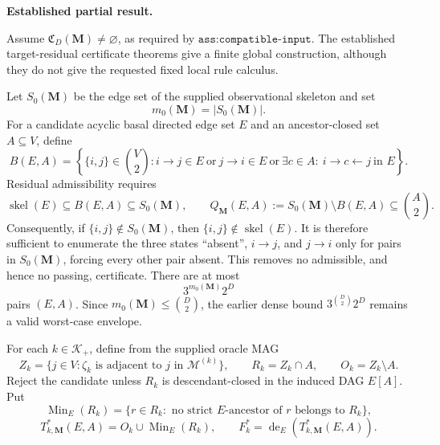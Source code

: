 \textbf{Established partial result.}

Assume \(\mathfrak C_D(\mathbf M)\ne\varnothing\), as required by \(\texttt{ass:compatible-input}\).  The established target-residual certificate theorems give a finite global construction, although they do not give the requested fixed local rule calculus.

Let \(S_0(\mathbf M)\) be the edge set of the supplied observational skeleton and set
\[
m_0(\mathbf M)=|S_0(\mathbf M)|.
\]
For a candidate acyclic basal directed edge set \(E\) and an ancestor-closed set \(A\subseteq V\), define
\[
B(E,A)=\left\{\{i,j\}\in\binom V2:
i\to j\in E\ \text{or}\ j\to i\in E\ \text{or}\
\exists c\in A:\ i\to c\leftarrow j\ \text{in }E
\right\}.
\]
Residual admissibility requires
\[
\operatorname{skel}(E)\subseteq B(E,A)\subseteq S_0(\mathbf M),
\qquad
Q_{\mathbf M}(E,A):=S_0(\mathbf M)\setminus B(E,A)
\subseteq\binom A2.
\]
Consequently, if \(\{i,j\}\notin S_0(\mathbf M)\), then \(\{i,j\}\notin\operatorname{skel}(E)\).  It is therefore sufficient to enumerate the three states ``absent'', \(i\to j\), and \(j\to i\) only for pairs in \(S_0(\mathbf M)\), forcing every other pair absent.  This removes no admissible, and hence no passing, certificate.  There are at most
\[
3^{m_0(\mathbf M)}2^D
\]
pairs \((E,A)\).  Since \(m_0(\mathbf M)\le\binom D2\), the earlier dense bound \(3^{\binom D2}2^D\) remains a valid worst-case envelope.

For each \(k\in\mathcal K_+\), define from the supplied oracle MAG
\[
Z_k=\{j\in V:\zeta_k\text{ is adjacent to }j\text{ in }\mathcal M^{(k)}\},
\qquad
R_k=Z_k\cap A,
\qquad
O_k=Z_k\setminus A.
\]
Reject the candidate unless \(R_k\) is descendant-closed in the induced DAG \(E[A]\).  Put
\[
\operatorname{Min}_E(R_k)
=\{r\in R_k:\text{ no strict }E\text{-ancestor of }r\text{ belongs to }R_k\},
\]
\[
T^*_{k,\mathbf M}(E,A)=O_k\cup\operatorname{Min}_E(R_k),
\qquad
F_k^*=\operatorname{de}_E\!\left(T^*_{k,\mathbf M}(E,A)\right).
\]

